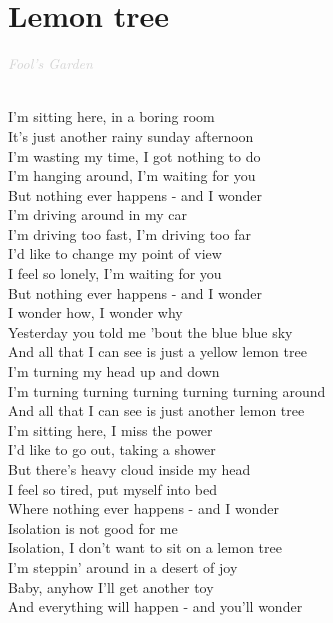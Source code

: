 \documentclass[a5paper, 10pt]{book}
\begin{document}
\section{Lemon tree}\textcolor{lightgray}{\textit{Fool's Garden}}\\~\\
\begin{minipage}[t]{0.8\textwidth}
  I'm sitting here, in a boring room \\
  It's just another rainy sunday afternoon\\
  I'm wasting my time, I got nothing to do\\
  I'm hanging around, I'm waiting for you\\
  But nothing ever happens - and I wonder\\

  I'm driving around in my car\\
  I'm driving too fast, I'm driving too far\\
  I'd like to change my point of view\\
  I feel so lonely, I'm waiting for you\\
  But nothing ever happens - and I wonder\\

  \hspace*{5mm}I wonder how, I wonder why\\
  \hspace*{5mm}Yesterday you told me 'bout the blue blue sky \\
  \hspace*{5mm}And all that I can see is just a yellow lemon tree\\

  \hspace*{5mm}I'm turning my head up and down\\
  \hspace*{5mm}I'm turning turning turning turning turning around\\
  \hspace*{5mm}And all that I can see is just another lemon tree\\

  I'm sitting here, I miss the power \\
  I'd like to go out, taking a shower\\
  But there's heavy cloud inside my head\\
  I feel so tired, put myself into bed\\
  Where nothing ever happens - and I wonder \\

  \hspace*{3mm}Isolation is not good for me\\
  \hspace*{3mm}Isolation, I don't want to sit on a lemon tree \\

  I'm steppin' around in a desert of joy\\
  Baby, anyhow I'll get another toy\\
  And everything will happen - and you'll wonder\\

\end{minipage}
\end{document}
